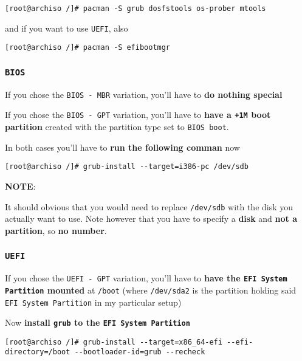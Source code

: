 \documentclass[9pt]{report}
\newcommand{\admonition}[2]{\textbf{#1}: {#2}}
\begin{document}
\begin{verbatim}
[root@archiso /]# pacman -S grub dosfstools os-prober mtools
\end{verbatim}

and if you want to use \texttt{UEFI}, also


\begin{verbatim}
[root@archiso /]# pacman -S efibootmgr
\end{verbatim}


\vfill\eject

\hypertarget{x-bios}{\subsubsection{\texttt{BIOS}}}
If you chose the \texttt{BIOS - MBR} variation, you’ll have to \textbf{do nothing special}


If you chose the \texttt{BIOS - GPT} variation, you’ll have to \textbf{have a \texttt{+1M} boot partition} created with the partition type set to \texttt{BIOS boot}.


In both cases you’ll have to \textbf{run the following comman} now


\begin{verbatim}
[root@archiso /]# grub-install --target=i386-pc /dev/sdb
\end{verbatim}

\admonition{NOTE}{It should obvious that you would need to replace \texttt{/dev/sdb} with the disk you actually want to use.
Note however that you have to specify a \textbf{disk} and \textbf{not a partition}, so \textbf{no number}.

}

\vfill\eject

\hypertarget{x-uefi}{\subsubsection{\texttt{UEFI}}}
If you chose the \texttt{UEFI - GPT} variation, you’ll have to \textbf{have the \texttt{EFI System Partition} mounted} at \texttt{/boot} (where \texttt{/dev/sda2} is the partition holding said \texttt{EFI System Partition} in my particular setup)


Now \textbf{install \texttt{grub} to the \texttt{EFI System Partition}}


\begin{verbatim}
[root@archiso /]# grub-install --target=x86_64-efi --efi-directory=/boot --bootloader-id=grub --recheck
\end{verbatim}
\end{document}
